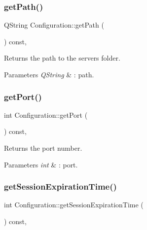 \subsubsection{\texorpdfstring{get\+Path()}{getPath()}}
{\footnotesize\ttfamily Q\+String Configuration\+::get\+Path (\begin{DoxyParamCaption}{ }\end{DoxyParamCaption}) const\hspace{0.3cm}{\ttfamily [inline]}, {\ttfamily [noexcept]}}



Returns the path to the server\textquotesingle{}s folder. 


\begin{DoxyParams}{Parameters}
{\em Q\+String} & \+: path. \\
\hline
\end{DoxyParams}
\mbox{\label{class_configuration_a71c68a3810e4c408e1e76f66b4ab11ff}} 
\subsubsection{\texorpdfstring{get\+Port()}{getPort()}}
{\footnotesize\ttfamily int Configuration\+::get\+Port (\begin{DoxyParamCaption}{ }\end{DoxyParamCaption}) const\hspace{0.3cm}{\ttfamily [inline]}, {\ttfamily [noexcept]}}



Returns the port number. 


\begin{DoxyParams}{Parameters}
{\em int} & \+: port. \\
\hline
\end{DoxyParams}
\mbox{\label{class_configuration_a56f953d35c709126b15603071b4132ab}} 
\subsubsection{\texorpdfstring{get\+Session\+Expiration\+Time()}{getSessionExpirationTime()}}
{\footnotesize\ttfamily int Configuration\+::get\+Session\+Expiration\+Time (\begin{DoxyParamCaption}{ }\end{DoxyParamCaption}) const\hspace{0.3cm}{\ttfamily [inline]}, {\ttfamily [noexcept]}}



